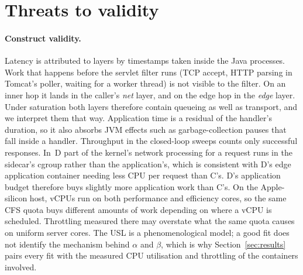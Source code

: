\section{Threats to validity}
\label{sec:threats}

\paragraph{Construct validity.} Latency is attributed to layers by timestamps taken inside the Java processes.
Work that happens before the servlet filter runs (TCP accept, HTTP parsing in Tomcat's poller, waiting for a
worker thread) is not visible to the filter. On an inner hop it lands in the caller's \emph{net} layer, and on
the edge hop in the \emph{edge} layer. Under saturation both layers therefore contain queueing as well as
transport, and we interpret them that way. Application time is a residual of the handler's duration, so it also
absorbs JVM effects such as garbage-collection pauses that fall inside a handler. Throughput in the closed-loop
sweeps counts only successful responses. In~D part of the kernel's network processing for a request runs in
the sidecar's cgroup rather than the application's, which is consistent with D's edge application container
needing less CPU per request than C's. D's application budget therefore buys slightly more application work than
C's. On the Apple-silicon host, vCPUs run on both performance and efficiency cores, so the same CFS quota buys
different amounts of work depending on where a vCPU is scheduled. Throttling measured there may overstate what
the same quota causes on uniform server cores. The USL is a phenomenological model; a good fit does not identify
the mechanism behind $\alpha$ and $\beta$, which is why Section~\ref{sec:results} pairs every fit with the
measured CPU utilisation and throttling of the containers involved.

